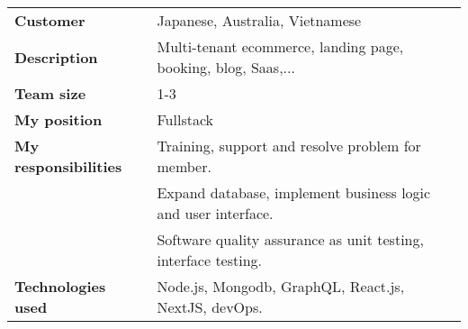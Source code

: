 \documentclass[10pt]{article} %
\begin{document}
\begin{tabular}{ll}
  \textbf{Customer} & Japanese, Australia, Vietnamese \\
  \textbf{Description} & Multi-tenant ecommerce, landing page, booking, blog, Saas,... \\
  \textbf{Team size} & 1-3 \\
  \textbf{My position} & Fullstack \\
  \textbf{My responsibilities} & Training, support and resolve problem for member. \\
                               &  Expand database, implement business logic and user interface. \\
                               &  Software quality assurance as unit testing, interface testing. \\
  \textbf{Technologies used} & Node.js, Mongodb, GraphQL, React.js, NextJS, devOps. \\
\end{tabular}


\pagebreak
\end{document}
